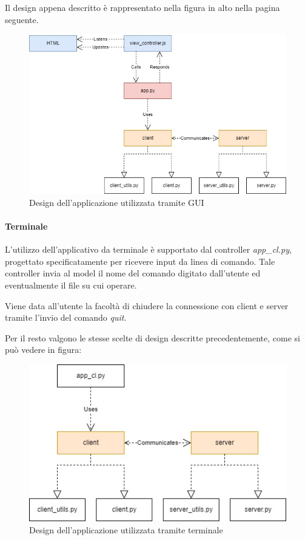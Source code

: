 \documentclass[a4paper,12pt]{report}
\begin{document}
Il design appena descritto è rappresentato nella figura in alto nella pagina seguente.
\begin{figure}[H]
    \centering
    \includegraphics[scale=0.5]{img/app_design.jpg}
    \caption{Design dell'applicazione utilizzata tramite GUI}
\end{figure}

\paragraph{Terminale} 
L'utilizzo dell'applicativo da terminale è supportato dal controller \textit{app\_cl.py}, progettato specificatamente per ricevere input da linea di comando. Tale controller invia al model il nome del comando digitato dall'utente ed eventualmente il file su cui operare.

Viene data all'utente la facoltà di chiudere la connessione con client e server tramite l'invio del comando \textit{quit}.

Per il resto valgono le stesse scelte di design descritte precedentemente, come si può vedere in figura:
\begin{figure}[H]
    \centering
    \includegraphics[scale=0.62]{img/cl_design.jpg}
    \caption{Design dell'applicazione utilizzata tramite terminale}
\end{figure}
\end{document}
